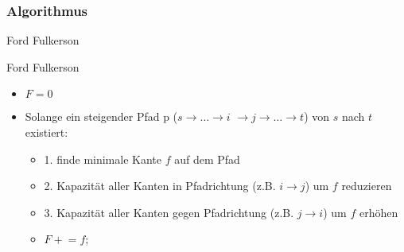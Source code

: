\subsubsection{Algorithmus}
\begin{frame}{Ford Fulkerson}
  \begin{block}{Ford Fulkerson}
    \begin{itemize}
      \item $F = 0$
      \pause
      \item Solange ein steigender Pfad p ($s \rightarrow\dots\rightarrow i$ $\rightarrow j\rightarrow\dots\rightarrow t$) von $s$ nach $t$ existiert:
      \pause
      \begin{itemize}
      \item 1. finde minimale Kante $f$ auf dem Pfad
      \pause
      \item 2. Kapazität aller Kanten in Pfadrichtung (z.B. $i\rightarrow j$) um $f$ reduzieren
      \pause
      \item 3. Kapazität aller Kanten gegen Pfadrichtung (z.B. $j\rightarrow i$) um $f$ erhöhen 
      \pause
      \item $F \mathrel{+}= f$;
      \end{itemize}
    \end{itemize}
  \end{block}
\end{frame}
